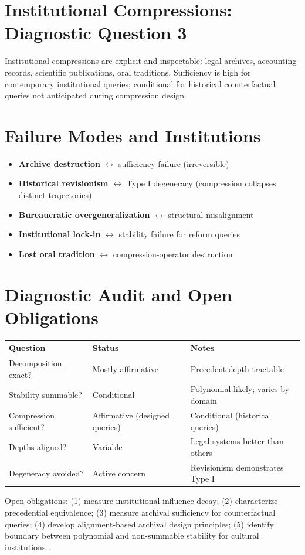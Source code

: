 \section{Institutional Compressions: Diagnostic Question 3}

Institutional compressions are explicit and inspectable: legal archives, accounting records, scientific publications, oral traditions. Sufficiency is high for contemporary institutional queries; conditional for historical counterfactual queries not anticipated during compression design.

\section{Failure Modes and Institutions}

\begin{itemize}
  \item \textbf{Archive destruction} $\leftrightarrow$ sufficiency failure (irreversible)
  \item \textbf{Historical revisionism} $\leftrightarrow$ Type I degeneracy (compression collapses distinct trajectories)
  \item \textbf{Bureaucratic overgeneralization} $\leftrightarrow$ structural misalignment
  \item \textbf{Institutional lock-in} $\leftrightarrow$ stability failure for reform queries
  \item \textbf{Lost oral tradition} $\leftrightarrow$ compression-operator destruction
\end{itemize}

\section{Diagnostic Audit and Open Obligations}

\begin{center}\small
\begin{tabular}{lll}
\toprule
Question & Status & Notes \\
\midrule
Decomposition exact? & Mostly affirmative & Precedent depth tractable \\
Stability summable? & Conditional & Polynomial likely; varies by domain \\
Compression sufficient? & Affirmative (designed queries) & Conditional (historical queries) \\
Depths aligned? & Variable & Legal systems better than others \\
Degeneracy avoided? & Active concern & Revisionism demonstrates Type I \\
\bottomrule
\end{tabular}
\end{center}

Open obligations: (1) measure institutional influence decay; (2) characterize precedential equivalence; (3) measure archival sufficiency for counterfactual queries; (4) develop alignment-based archival design principles; (5) identify boundary between polynomial and non-summable stability for cultural institutions \cite{David1985,Arthur1994}.
